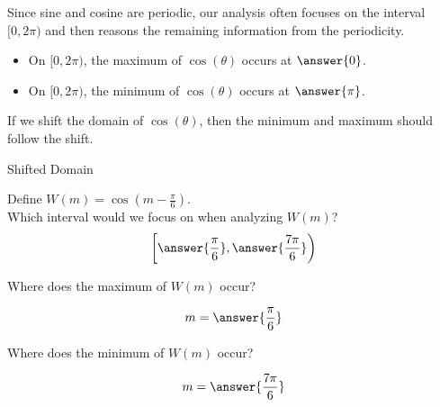 \documentclass{ximera}
\author{Lee Wayand}
\begin{document}
\begin{exercise}





Since sine and cosine are periodic, our analysis often focuses on the interval $[0, 2\pi)$ and then reasons the remaining information from the periodicity.  \\

\begin{itemize}
\item On $[0, 2\pi)$, the maximum of $\cos(\theta)$ occurs at $\answer{0}$. 
\item On $[0, 2\pi)$, the minimum of $\cos(\theta)$ occurs at $\answer{\pi}$. 
\end{itemize}





If we shift the domain of $\cos(\theta)$, then the minimum and maximum should follow the shift. \\




\begin{question} Shifted Domain 

Define $W(m) = \cos\left(m - \frac{\pi}{6} \right)$. \\




Which interval would we focus on when analyzing $W(m)$? \\

\[
\left[      \answer{\frac{\pi}{6}},   \answer{\frac{7\pi}{6}}     \right)
\]




Where does the maximum of $W(m)$ occur?

\[
m = \answer{\frac{\pi}{6}} 
\]





Where does the minimum of $W(m)$ occur?

\[
m = \answer{\frac{7\pi}{6}} 
\]



\end{question}


















\end{exercise}
\end{document}
